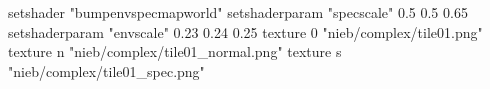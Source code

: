 setshader "bumpenvspecmapworld"
setshaderparam "specscale" 0.5 0.5 0.65
setshaderparam "envscale"  0.23 0.24 0.25
   texture 0 "nieb/complex/tile01.png"
   texture n "nieb/complex/tile01_normal.png"
   texture s "nieb/complex/tile01_spec.png"